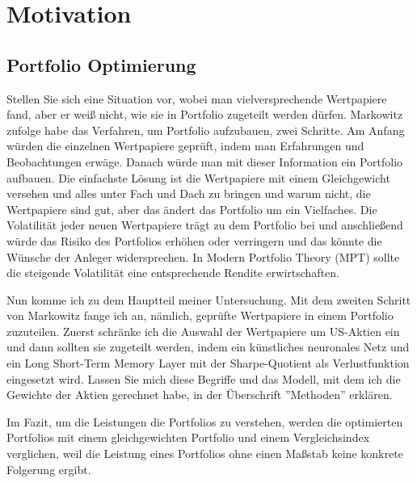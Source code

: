 \documentclass[12pt]{article}
\begin{document}
    \newpage

    \newpage \section{Motivation} 
    
        \subsection{Portfolio Optimierung}
            
            Stellen Sie sich eine Situation vor, wobei man vielversprechende Wertpapiere fand, 
            aber er weiß nicht, wie sie in Portfolio zugeteilt werden dürfen. 
            Markowitz \cite{markowitz1952} zufolge habe das Verfahren, um Portfolio aufzubauen, zwei Schritte. 
            Am Anfang würden die einzelnen Wertpapiere geprüft, indem man Erfahrungen und Beobachtungen erwäge. 
            Danach würde man mit dieser Information ein Portfolio aufbauen. 
            Die einfachste Lösung ist die Wertpapiere mit einem Gleichgewicht versehen und 
            alles unter Fach und Dach zu bringen und warum nicht, die Wertpapiere sind gut, 
            aber das ändert das Portfolio um ein Vielfaches.
            Die Volatilität jeder neuen Wertpapiere trägt zu dem Portfolio bei und
            anschließend würde das Risiko des Portfolios erhöhen oder verringern und das könnte die Wünsche der Anleger widersprechen. 
            In Modern Portfolio Theory (MPT) sollte die steigende Volatilität eine entsprechende Rendite erwirtschaften. 

            Nun komme ich zu dem Hauptteil meiner Untersuchung. 
            Mit dem zweiten Schritt von Markowitz fange ich an, nämlich, geprüfte Wertpapiere in einem Portfolio zuzuteilen. 
            Zuerst schränke ich die Auswahl der Wertpapiere um US-Aktien ein und
            dann sollten sie zugeteilt werden, indem ein künstliches neuronales Netz und
            ein Long Short-Term Memory Layer mit der Sharpe-Quotient als Verlustfunktion eingesetzt wird. 
            Lassen Sie mich diese Begriffe und das Modell, mit dem ich die Gewichte der Aktien gerechnet habe, 
            in der Überschrift ''Methoden'' erklären.

            Im Fazit, um die Leistungen die Portfolios zu verstehen, 
            werden die optimierten Portfolios mit einem gleichgewichten Portfolio und 
            einem Vergleichsindex verglichen, weil die Leistung eines Portfolios ohne einen Maßstab keine konkrete Folgerung ergibt.
\end{document}

